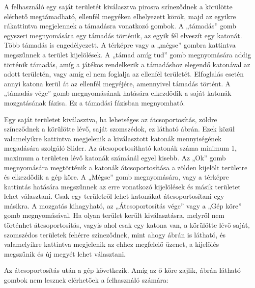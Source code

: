 

A felhasználó egy saját területét kiválasztva pirosra színeződnek a körülötte elérhető megtámadható, ellenfél megyéken elhelyezett körök, majd az egyikre rákattintva megjelennek a támadásra vonatkozó gombok.
A „támadás” gomb egyszeri megnyomására egy támadás történik, az egyik fél elveszít egy katonát.
Több támadás is engedélyezett.
A térképre vagy a „mégse” gombra kattintva megszűnnek a terület kijelölések.
A „támad amíg tud” gomb megnyomására addig történik támadás, amíg a játékos rendelkezik a támadáshoz elegendő katonával az adott területén, vagy amíg el nem foglalja az ellenfél területét.
Elfoglalás esetén annyi katona kerül át az ellenfél megyéjére, amennyivel támadás történt.
A „támadás vége” gomb megnyomásának hatására elkezdődik a saját katonák mozgatásának fázisa.
Ez a támadási fázisban megnyomható. 


%




Egy saját területet kiválasztva, ha lehetséges az átcsoportosítás, zöldre színeződnek a körülötte lévő, saját szomszédok, ez látható  ábrán.
Ezek közül valamelyikre kattintva megjelenik a kiválasztott katonák mennyiségének megadására szolgáló Slider.
Az átcsoportosítható katonák száma minimum 1, maximum a területen lévő katonák számánál egyel kisebb.
Az „Ok” gomb megnyomására megtörténik a katonák átcsoportosítása a zölden kijelölt területre és elkezdődik a gép köre.
A „Mégse” gomb megnyomására, vagy a térképre kattintás hatására megszűnnek az erre vonatkozó kijelölések és másik területet lehet választani.
Csak egy területről lehet katonákat átcsoportosítani egy másikra.
A mozgatás kihagyható, az „Átcsoportosítás vége” vagy a „Gép köre” gomb megnyomásával.
Ha olyan terület került kiválasztásra, melyről nem történhet átcsoportosítás, vagyis ahol csak egy katona van, a körülötte lévő saját, szomszédos területek fehérre színeződnek, mint ahogy  ábrán is látható, és valamelyikre kattintva megjelenik az ehhez megfelelő üzenet, a kijelölés megszűnik és új megyét lehet választani.  

 


Az átcsoportosítás után a gép következik. Amíg az ő köre zajlik,  ábrán látható gombok nem lesznek elérhetőek a felhasználó számára: 

